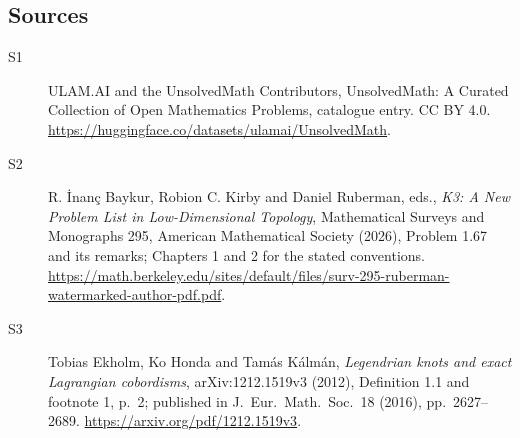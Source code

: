 \documentclass[11pt]{article}
\begin{document}
\subsection{Sources}
\begin{description}
\item[\hypertarget{source:statement:1}{S1}] ULAM.AI and the UnsolvedMath Contributors, UnsolvedMath: A Curated Collection of Open Mathematics Problems, catalogue entry. CC BY 4.0. \url{https://huggingface.co/datasets/ulamai/UnsolvedMath}.
\item[\hypertarget{source:statement:2}{S2}] R. İnanç Baykur, Robion C. Kirby and Daniel Ruberman, eds., \emph{K3: A New Problem List in Low-Dimensional Topology}, Mathematical Surveys and Monographs 295, American Mathematical Society (2026), Problem 1.67 and its remarks; Chapters 1 and 2 for the stated conventions. \url{https://math.berkeley.edu/sites/default/files/surv-295-ruberman-watermarked-author-pdf.pdf}.
\item[\hypertarget{source:statement:3}{S3}] Tobias Ekholm, Ko Honda and Tamás Kálmán, \emph{Legendrian knots and exact Lagrangian cobordisms}, arXiv:1212.1519v3 (2012), Definition 1.1 and footnote 1, p.\ 2; published in J.\ Eur.\ Math.\ Soc.\ 18 (2016), pp.\ 2627--2689. \url{https://arxiv.org/pdf/1212.1519v3}.
\end{description}
\label{end:statement}
\end{document}
